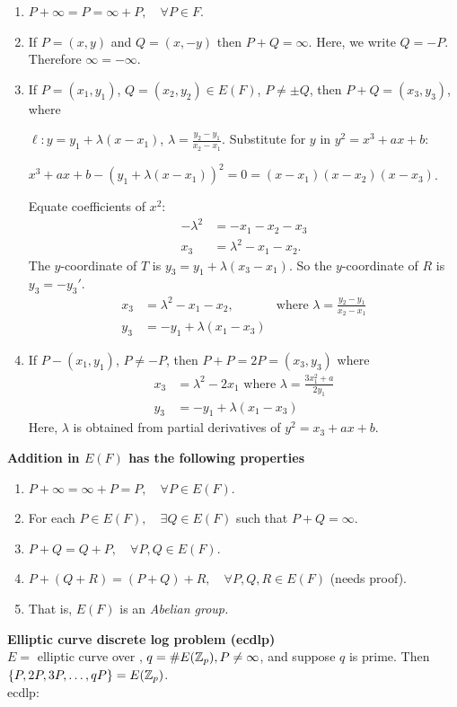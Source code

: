 \documentclass[a4paper,12pt]{article}
\begin{document}
\begin{enumerate}
\item
$P+\infty = P = \infty + P,\quad \forall P \in F$.
\item
If $P = (x,y)$ and $Q = (x,-y)$ then $P+Q=\infty$.
Here, we write $Q = -P$.  Therefore $\infty = - \infty$.
\item
If $P=(x_1,y_1)$, $Q=(x_2,y_2)\in E(F)$, $P\ne \pm Q$,
then $P+Q = (x_3,y_3)$, where

$\ell : y=y_1 + \lambda(x-x_1)$, $\lambda = \frac{y_2 - y_1}{x_2-x_1}$.
Substitute for $y$ in $y^2 = x^3 + ax + b$:

$x^3+ax + b - (y_1 + \lambda(x-x_1))^2 = 0 = (x-x_1)(x-x_2)(x-x_3)$.

Equate coefficients of $x^2$:
\begin{align*}
-\lambda^2 &= -x_1 - x_2 - x_3 \\
x_3 &= \lambda^2 - x_1 - x_2.
\end{align*}
The $y$-coordinate of $T$ is $y_3 = y_1 + \lambda (x_3 - x_1)$.
So the $y$-coordinate of $R$ is $y_3 = -y_3'$.
\begin{align*}
x_3 &= \lambda^2 - x_1 - x_2, 
&\text{where } \lambda = \frac{y_2-y_1}{x_2-x_1}\\
y_3 &= -y_1 + \lambda(x_1-x_3)
\end{align*}
\item
If $P - (x_1,y_1)$, $P\ne -P$, then $P + P = 2P = (x_3,y_3)$ where
\begin{align*}
x_3 &= \lambda^2 - 2x_1 
\text{ where } \lambda = \frac{3x_1^2 + a}{2y_1}\\
y_3 &= -y_1 + \lambda (x_1 - x_3)
\end{align*}
Here, $\lambda$ is obtained from partial derivatives of $y^2 = x_3 + ax +b$.
\end{enumerate}
{\bf Addition in $E(F)$ has the following properties}
\begin{enumerate}
\item
$P+\infty = \infty + P = P,\quad\forall P \in E(F)$.
\item
For each $P\in E(F),\quad \exists Q \in E(F)$ such that $P+Q = \infty$.
\item
$P+Q = Q+P,\quad \forall P,Q \in E(F)$.
\item
$P+(Q+R)=(P+Q)+R,\quad\forall P,Q,R \in E(F)$ (needs proof).
\item[]
That is, $E(F)$ is an {\it Abelian group.}
\end{enumerate}
{\bf Elliptic curve discrete log problem ({\sc ecdlp})}
\\[1em]
$E=$ elliptic curve over \zp,
$q=\#E(\mathbb{Z}_p), P\ne \infty$, and suppose $q$ is prime.
Then $\{ P, 2P, 3P, \ldots, qP \} = E(\mathbb{Z}_p)$.
\\[1em]
{\sc ecdlp}:
\end{document}
